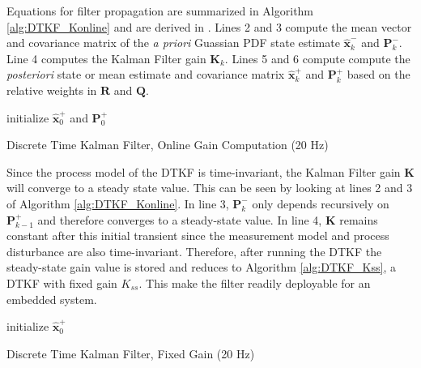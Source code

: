 Equations for filter propagation are summarized in Algorithm \ref{alg:DTKF_Konline} and are derived in \cite{stengel2012optimal,simon2006optimal}. Lines 2 and 3 compute the mean vector and covariance matrix of the \textit{a priori} Guassian PDF state estimate $\hat{\mathbf{x}}_k^-$ and $\mathbf{P}_k^-$. Line 4 computes the Kalman Filter gain $\mathbf{K}_{k}$. Lines 5 and 6 compute compute the \textit{posteriori} state or mean estimate and covariance matrix $\hat{\mathbf{x}}_k^+$ and $\mathbf{P}_k^+$ based on the relative weights in $\mathbf{R}$ and $\mathbf{Q}$.
\begin{algorithm}[h]
\SetAlgoLined
\vspace{5pt}
initialize $\hat{\mathbf{x}}_0^+$ and $\mathbf{P}_0^+$\;
 \caption{Discrete Time Kalman Filter, Online Gain Computation (20 Hz)}\label{alg:DTKF_Konline}
\end{algorithm}

Since the process model of the DTKF is time-invariant, the Kalman Filter gain $\mathbf{K}$ will converge to a steady state value. This can be seen by looking at lines 2 and 3 of Algorithm \ref{alg:DTKF_Konline}. In line 3, $\mathbf{P}_k^-$ only depends recursively on $\mathbf{P}_{k-1}^+$ and therefore converges to a steady-state value. In line 4, $\mathbf{K}$ remains constant after this initial transient since the measurement model and process disturbance are also time-invariant. Therefore, after running the DTKF the steady-state gain value is stored and reduces to Algorithm \ref{alg:DTKF_Kss}, a DTKF with fixed gain $K_{ss}$. This make the filter readily deployable for an embedded system.

\begin{algorithm}[h]
\SetAlgoLined
\vspace{5pt}
 initialize $\hat{\mathbf{x}}_0^+$\;
 \caption{Discrete Time Kalman Filter, Fixed Gain (20 Hz)}\label{alg:DTKF_Kss}
\end{algorithm}

